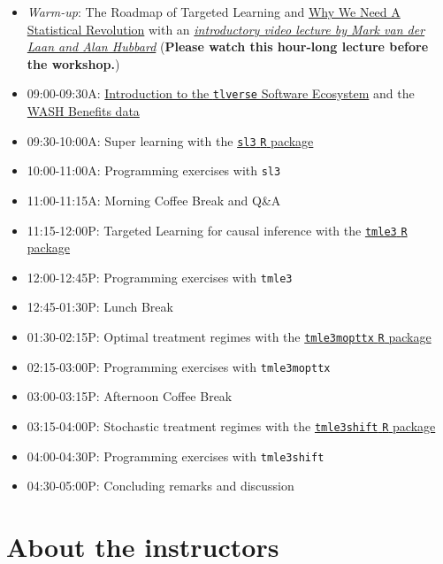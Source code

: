 \documentclass[
  12pt, krantz2,
]{book}
\newcommand{\passthrough}[1]{#1}
\providecommand{\tightlist}{%
  \setlength{\itemsep}{0pt}\setlength{\parskip}{0pt}}
\theoremstyle{definition}
\theoremstyle{definition}
\theoremstyle{definition}
\newcommand{\1}{\mathbbm{1}}
\begin{document}
\begin{itemize}
\tightlist
\item
  \emph{Warm-up}: The Roadmap of Targeted Learning and \href{https://senseaboutscienceusa.org/super-learning-and-the-revolution-in-knowledge/}{Why We Need A Statistical
  Revolution}
  with an \emph{\href{https://www.dropbox.com/s/7b6ru2ahycqq80v/ENAR2021-lecture.mp4?dl=0}{introductory video lecture by Mark van der Laan and Alan
  Hubbard}}
  (\textbf{Please watch this hour-long lecture before the workshop.})
\item
  09:00-09:30A: \href{https://tlverse.org}{Introduction to the \passthrough{\lstinline!tlverse!} Software
  Ecosystem} and the \href{http://www.washbenefits.net/}{WASH Benefits
  data}
\item
  09:30-10:00A: Super learning with the \href{https://github.com/tlverse/sl3}{\passthrough{\lstinline!sl3!} \passthrough{\lstinline!R!}
  package}
\item
  10:00-11:00A: Programming exercises with \passthrough{\lstinline!sl3!}
\item
  11:00-11:15A: Morning Coffee Break and Q\&A
\item
  11:15-12:00P: Targeted Learning for causal inference with the \href{https://github.com/tlverse/tmle3}{\passthrough{\lstinline!tmle3!} \passthrough{\lstinline!R!}
  package}
\item
  12:00-12:45P: Programming exercises with \passthrough{\lstinline!tmle3!}
\item
  12:45-01:30P: Lunch Break
\item
  01:30-02:15P: Optimal treatment regimes with the \href{https://github.com/tlverse/tmle3mopttx}{\passthrough{\lstinline!tmle3mopttx!} \passthrough{\lstinline!R!}
  package}
\item
  02:15-03:00P: Programming exercises with \passthrough{\lstinline!tmle3mopttx!}
\item
  03:00-03:15P: Afternoon Coffee Break
\item
  03:15-04:00P: Stochastic treatment regimes with the \href{https://github.com/tlverse/tmle3shift}{\passthrough{\lstinline!tmle3shift!} \passthrough{\lstinline!R!}
  package}
\item
  04:00-04:30P: Programming exercises with \passthrough{\lstinline!tmle3shift!}
\item
  04:30-05:00P: Concluding remarks and discussion
\end{itemize}

\hypertarget{about-the-instructors}{%
\section*{About the instructors}\label{about-the-instructors}}
\end{document}
